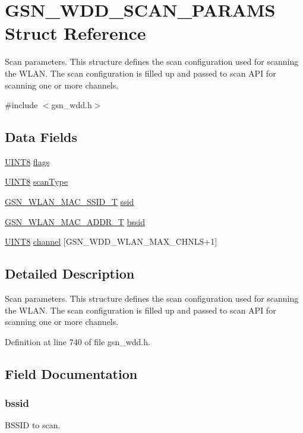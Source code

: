\hypertarget{a00286}{
\section{GSN\_\-WDD\_\-SCAN\_\-PARAMS Struct Reference}
\label{a00286}
}


Scan parameters. This structure defines the scan configuration used for scanning the WLAN. The scan configuration is filled up and passed to scan API for scanning one or more channels.  




{\ttfamily \#include $<$gsn\_\-wdd.h$>$}

\subsection*{Data Fields}
\begin{DoxyCompactItemize}
\item 
\hyperlink{a00660_gab27e9918b538ce9d8ca692479b375b6a}{UINT8} \hyperlink{a00286_aff576da693a444e63d8375c2b7c71df6}{flags}
\item 
\hyperlink{a00660_gab27e9918b538ce9d8ca692479b375b6a}{UINT8} \hyperlink{a00286_a000a5568cb4c2c12ad873696b2d6f83e}{scanType}
\item 
\hyperlink{a00417}{GSN\_\-WLAN\_\-MAC\_\-SSID\_\-T} \hyperlink{a00286_a9bcb2e5a0dbdd5461faec24950cf7459}{ssid}
\item 
\hyperlink{a00416}{GSN\_\-WLAN\_\-MAC\_\-ADDR\_\-T} \hyperlink{a00286_a1d70c2c8895c2763bdede85266c38318}{bssid}
\item 
\hyperlink{a00660_gab27e9918b538ce9d8ca692479b375b6a}{UINT8} \hyperlink{a00286_ad3776fa16ca5b00d270cd6365ac42a6f}{channel} \mbox{[}GSN\_\-WDD\_\-WLAN\_\-MAX\_\-CHNLS+1\mbox{]}
\end{DoxyCompactItemize}


\subsection{Detailed Description}
Scan parameters. This structure defines the scan configuration used for scanning the WLAN. The scan configuration is filled up and passed to scan API for scanning one or more channels. 

Definition at line 740 of file gsn\_\-wdd.h.



\subsection{Field Documentation}
\hypertarget{a00286_a1d70c2c8895c2763bdede85266c38318}{
\subsubsection[{bssid}]{ {\bf bssid}}}
\label{a00286_a1d70c2c8895c2763bdede85266c38318}
BSSID to scan. 

